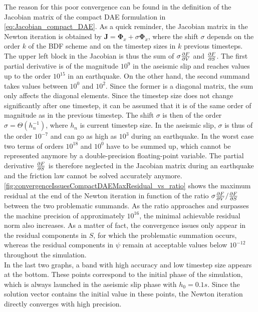 The reason for this poor convergence can be found in the definition of the Jacobian matrix of the compact DAE formulation in \autoref{eq:Jacobian_compact_DAE}. As a quick reminder, the Jacobian matrix in the Newton iteration is obtained by $\mathbf{J} = \bm{\Phi}_x + \sigma \bm{\Phi}_{\dot{x}}$, where the shift $\sigma$ depends on the order $k$ of the BDF scheme and on the timestep sizes in  $k$ previous timesteps. The upper left block in the Jacobian is thus the sum of $\sigma\pdv{F}{V}$ and $\pdv{F}{S}$. The first partial derivative is of the magnitude $10^9$ in the aseismic slip and reaches values up to the order $10^{15}$ in an earthquake. On the other hand, the second summand takes values between $10^0$ and $10^2$. Since the former is a diagonal matrix, the sum only affects the diagonal elements. Since the timestep size does not change significantly after one timestep, it can be assumed that it is of the same order of magnitude as in the previous timestep. The shift $\sigma$ is then of the order $\sigma = \Theta\left(h_n^{-1}\right)$, where $h_n$ is current timestep size. In the aseismic slip, $\sigma$ is thus of the order $10^{-7}$ and can go as high as $10^3$ during an earthquake. In the worst case two terms of orders $10^{18}$ and $10^0$ have to be summed up, which cannot be represented anymore by a double-precision floating-point variable. The partial derivative $\pdv{F}{S}$ is therefore neglected in the Jacobian matrix during an earthquake and the friction law cannot be solved accurately anymore. \\
\autoref{fig:convergenceIssuesCompactDAEMaxResidual_vs_ratio} shows the maximum residual at the end of the Newton iteration in function of the ratio $\sigma\pdv{F}{V} / \pdv{F}{S}$ between the two problematic summands. As the ratio approaches and surpasses the machine precision of approximately $10^{16}$, the minimal achievable residual norm also increases. As a matter of fact, the convergence issues only appear in the residual components in $S$, for which the problematic summation occurs, whereas the residual components in $\psi$ remain at acceptable values below $10^{-12}$ throughout the simulation.
\\
In the last two graphs, a band with high accuracy and low timestep size appears at the bottom. These points correspond to the initial phase of the simulation, which is always launched in the aseismic slip phase with $h_0=0.1s$. Since the solution vector contains the initial value in these points, the Newton iteration directly converges with high precision. \\
